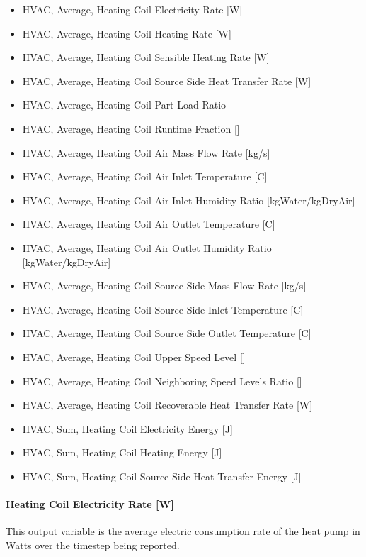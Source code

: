 \begin{itemize}
\item
  HVAC, Average, Heating Coil Electricity Rate {[}W{]}
\item
  HVAC, Average, Heating Coil Heating Rate {[}W{]}
\item
  HVAC, Average, Heating Coil Sensible Heating Rate {[}W{]}
\item
  HVAC, Average, Heating Coil Source Side Heat Transfer Rate {[}W{]}
\item
  HVAC, Average, Heating Coil Part Load Ratio
\item
  HVAC, Average, Heating Coil Runtime Fraction {[]}
\item
  HVAC, Average, Heating Coil Air Mass Flow Rate {[}kg/s{]}
\item
  HVAC, Average, Heating Coil Air Inlet Temperature {[}C{]}
\item
  HVAC, Average, Heating Coil Air Inlet Humidity Ratio {[}kgWater/kgDryAir{]}
\item
  HVAC, Average, Heating Coil Air Outlet Temperature {[}C{]}
\item
  HVAC, Average, Heating Coil Air Outlet Humidity Ratio {[}kgWater/kgDryAir{]}
\item
  HVAC, Average, Heating Coil Source Side Mass Flow Rate {[}kg/s{]}
\item
  HVAC, Average, Heating Coil Source Side Inlet Temperature {[}C{]}
\item
  HVAC, Average, Heating Coil Source Side Outlet Temperature {[}C{]}
\item
  HVAC, Average, Heating Coil Upper Speed Level {[]}
\item
  HVAC, Average, Heating Coil Neighboring Speed Levels Ratio {[]}
\item
  HVAC, Average, Heating Coil Recoverable Heat Transfer Rate {[}W{]}
\item
  HVAC, Sum, Heating Coil Electricity Energy {[}J{]}
\item
  HVAC, Sum, Heating Coil Heating Energy {[}J{]}
\item
  HVAC, Sum, Heating Coil Source Side Heat Transfer Energy {[}J{]}
\end{itemize}

\paragraph{Heating Coil Electricity Rate {[}W{]}}\label{heating-coil-electric-power-w-9}

This output variable is the average electric consumption rate of the heat pump in Watts over the timestep being reported.

